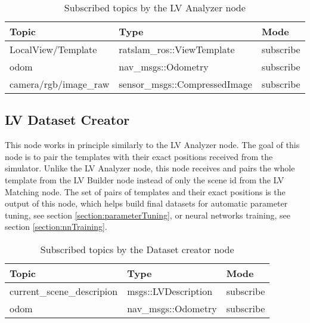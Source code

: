 \begin{table}[htpb]
    \caption{Subscribed  topics by the LV Analyzer node}\label{tab:lvAnalTopics}
    \centering
    \begin{tabular}{l l l}
        \toprule
        Topic                 & Type                          & Mode      \\
        \midrule
        LocalView/Template    & ratslam\_ros::ViewTemplate    & subscribe \\
        odom                  & nav\_msgs::Odometry           & subscribe \\
        camera/rgb/image\_raw & sensor\_msgs::CompressedImage & subscribe \\
        \bottomrule
    \end{tabular}
\end{table}

\subsection{LV Dataset Creator}\label{section:lvdatasetCreator}

This node works in principle similarly to the LV Analyzer node. The goal of this node is to pair the templates with their exact positions received from the simulator. Unlike the LV Analyzer node, this node receives and pairs the whole template from the LV Builder node instead of only the scene id from the LV Matching node. The set of pairs of templates and their exact positions is the output of this node, which helps build final datasets for automatic parameter tuning, see section \ref{section:parameterTuning}, or neural networks training, see section \ref{section:nnTraining}.


\begin{table}[htpb]
    \caption{Subscribed  topics by the Dataset creator node}\label{tab:datasetCreatorTopics}
    \centering
    \begin{tabular}{l l l}
        \toprule
        Topic                      & Type                & Mode      \\
        \midrule
        current\_scene\_descripion & msgs::LVDescription & subscribe \\
        odom                       & nav\_msgs::Odometry & subscribe \\
        \bottomrule
    \end{tabular}
\end{table}